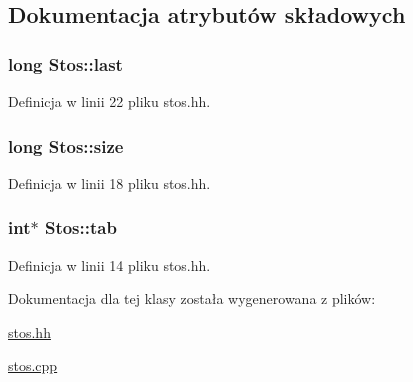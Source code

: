 \subsection{Dokumentacja atrybutów składowych}
\hypertarget{class_stos_ae0623cdf9b6725e38da86b74972d61ba}{
\subsubsection[{last}]{\setlength{\rightskip}{0pt plus 5cm}long Stos\-::last\hspace{0.3cm}{\ttfamily [private]}}}\label{class_stos_ae0623cdf9b6725e38da86b74972d61ba}


Definicja w linii 22 pliku stos.\-hh.

\hypertarget{class_stos_a07ba18a24f8f0dbd9144406d15bcd342}{
\subsubsection[{size}]{\setlength{\rightskip}{0pt plus 5cm}long Stos\-::size\hspace{0.3cm}{\ttfamily [private]}}}\label{class_stos_a07ba18a24f8f0dbd9144406d15bcd342}


Definicja w linii 18 pliku stos.\-hh.

\hypertarget{class_stos_abcb666dd5a69fe50228595dc8ac4160a}{
\subsubsection[{tab}]{\setlength{\rightskip}{0pt plus 5cm}int$\ast$ Stos\-::tab\hspace{0.3cm}{\ttfamily [private]}}}\label{class_stos_abcb666dd5a69fe50228595dc8ac4160a}


Definicja w linii 14 pliku stos.\-hh.



Dokumentacja dla tej klasy została wygenerowana z plików\-:\begin{DoxyCompactItemize}
\item 
\hyperlink{stos_8hh}{stos.\-hh}\item 
\hyperlink{stos_8cpp}{stos.\-cpp}\end{DoxyCompactItemize}
